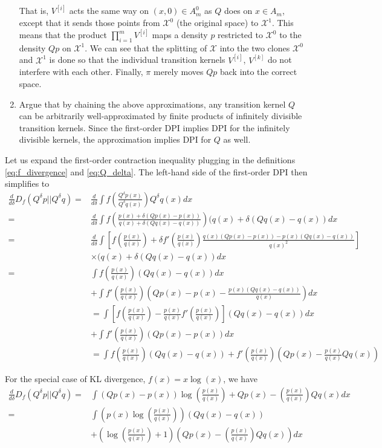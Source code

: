 \documentclass[12pt]{article}
\begin{document}
\begin{enumerate}
\[\]
That is, $V^{[i]}$ acts the same way on $(x,0) \in A_m^0$ as $Q$ does
on $x \in A_m$, except that it sends those points from $\mathcal{X}^0$
(the original space) to $\mathcal{X}^1$.  This means that the product
$\prod_{i=1}^m V^{[i]}$ maps a density $p$ restricted to
$\mathcal{X}^0$ to the density $Qp$ on $\mathcal{X}^1$.  We can see
that the splitting of $\mathcal{X}$ into the two clones
$\mathcal{X}^0$ and $\mathcal{X}^1$ is done so that the individual
transition kernels $V^{[i]}$, $V^{[k]}$ do not interfere with each
other.  Finally, $\pi$ merely moves $Qp$ back into the correct space.
\item 
Argue that by chaining the above approximations, any transition kernel
$Q$ can be arbitrarily well-approximated by finite products of
infinitely divisible transition kernels.  Since the first-order DPI
implies DPI for the infinitely divisible kernels, the approximation
implies DPI for $Q$ as well.
\end{enumerate}

Let us expand the first-order contraction inequality plugging in the
definitions \eqref{eq:f_divergence} and \eqref{eq:Q_delta}.  The left-hand side of the first-order DPI then simplifies to
\begin{align*}
\frac{d}{d\delta} D_f(Q^\delta p||Q^\delta q)
=& \frac{d}{d\delta}\int f\left(\frac{Q^\delta p(x)}{Q^\delta q(x)}\right) Q^\delta q(x) dx \\
=& \frac{d}{d\delta}\int f\left(\frac{p(x) + \delta(Qp(x) - p(x))}{q(x) + \delta(Qq(x) - q(x))}\right) (q(x) + \delta (Qq(x)-q(x)) dx \\
=& \frac{d}{d\delta}\int \left[f\left(\frac{p(x)}{q(x)}\right) + \delta f'\left(\frac{p(x)}{q(x)}\right) \frac{q(x)(Qp(x) - p(x)) - p(x) (Qq(x) - q(x))}{q(x)^2}\right]\\
&\times (q(x) + \delta (Qq(x)-q(x)) dx\\
=& \int f\left(\frac{p(x)}{q(x)}\right) (Qq(x)-q(x)) dx \\
&+ \int f'\left(\frac{p(x)}{q(x)}\right) \left(Qp(x) - p(x) - \frac{p(x) (Qq(x) - q(x))}{q(x)}\right)  dx
\\&=  \int \left[f\left(\frac{p(x)}{q(x)}\right) - \frac{p(x)}{q(x)}f'\left(\frac{p(x)}{q(x)}\right) \right] (Qq(x)-q(x)) dx\\
&+ \int f'\left(\frac{p(x)}{q(x)}\right) (Qp(x) - p(x))  dx
\\&= \int f\left(\frac{p(x)}{q(x)}\right) (Qq(x) - q(x)) + f'\left(\frac{p(x)}{q(x)}\right) \left( Qp(x) - \frac{p(x)}{q(x)}Qq(x) \right)
\end{align*}

For the special case of KL divergence, $f(x) = x\log(x)$, we have
\begin{align*}
\frac{d}{d\delta} D_f(Q^\delta p||Q^\delta q)=& \int (Qp(x) - p(x)) \log\left(\frac{p(x)}{q(x)}\right) + Qp(x) - \left(\frac{p(x)}{q(x)}\right) Qq(x) dx
\\=& \int \left(p(x) \log\left(\frac{p(x)}{q(x)}\right)\right)(Qq(x) - q(x)) 
\\&+ \left(\log\left(\frac{p(x)}{q(x)}\right) + 1\right)\left(Qp(x) - \left(\frac{p(x)}{q(x)}\right) Qq(x)\right) dx
\end{align*}
\end{document}
